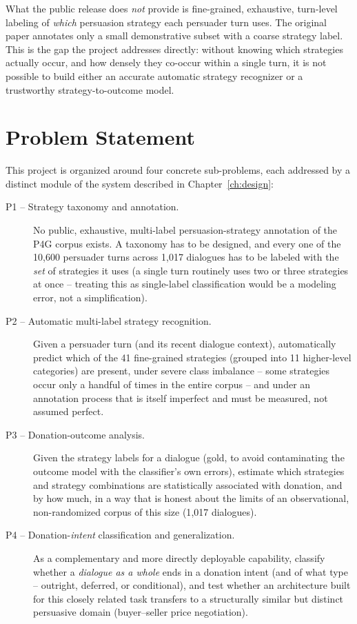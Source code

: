 What the public release does \emph{not} provide is fine-grained, exhaustive,
turn-level labeling of \emph{which} persuasion strategy each persuader turn
uses. The original paper annotates only a small demonstrative subset with a
coarse strategy label. This is the gap the project addresses directly: without
knowing which strategies actually occur, and how densely they co-occur within
a single turn, it is not possible to build either an accurate automatic
strategy recognizer or a trustworthy strategy-to-outcome model.

\section{Problem Statement}

This project is organized around four concrete sub-problems, each addressed
by a distinct module of the system described in Chapter~\ref{ch:design}:

\begin{description}
\item[P1 -- Strategy taxonomy and annotation.] No public, exhaustive,
  multi-label persuasion-strategy annotation of the P4G corpus exists.
  A taxonomy has to be designed, and every one of the 10{,}600 persuader
  turns across 1{,}017 dialogues has to be labeled with the \emph{set} of
  strategies it uses (a single turn routinely uses two or three strategies
  at once -- treating this as single-label classification would be a
  modeling error, not a simplification).
\item[P2 -- Automatic multi-label strategy recognition.] Given a persuader
  turn (and its recent dialogue context), automatically predict which of the
  41 fine-grained strategies (grouped into 11 higher-level categories) are
  present, under severe class imbalance -- some strategies occur only a
  handful of times in the entire corpus -- and under an annotation process
  that is itself imperfect and must be measured, not assumed perfect.
\item[P3 -- Donation-outcome analysis.] Given the strategy labels for a
  dialogue (gold, to avoid contaminating the outcome model with the
  classifier's own errors), estimate which strategies and strategy
  combinations are statistically associated with donation, and by how much,
  in a way that is honest about the limits of an observational,
  non-randomized corpus of this size (1{,}017 dialogues).
\item[P4 -- Donation-\emph{intent} classification and generalization.] As a
  complementary and more directly deployable capability, classify whether a
  \emph{dialogue as a whole} ends in a donation intent (and of what type --
  outright, deferred, or conditional), and test whether an architecture built
  for this closely related task transfers to a structurally similar but
  distinct persuasive domain (buyer--seller price negotiation).
\end{description}

